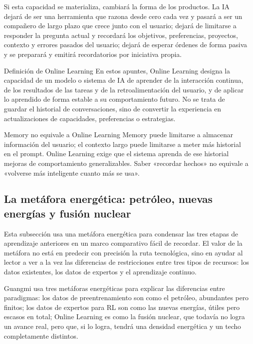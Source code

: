 \documentclass[a4paper]{article}
\begin{document}
Si esta capacidad se materializa, cambiará la forma de los productos. La IA dejará de ser una herramienta que razona desde cero cada vez y pasará a ser un compañero de largo plazo que crece junto con el usuario; dejará de limitarse a responder la pregunta actual y recordará los objetivos, preferencias, proyectos, contexto y errores pasados del usuario; dejará de esperar órdenes de forma pasiva y se preparará y emitirá recordatorios por iniciativa propia.

\begin{importantbox}{Definición de Online Learning}
En estos apuntes, Online Learning designa la capacidad de un modelo o sistema de IA de aprender de la interacción continua, de los resultados de las tareas y de la retroalimentación del usuario, y de aplicar lo aprendido de forma estable a su comportamiento futuro. No se trata de guardar el historial de conversaciones, sino de convertir la experiencia en actualizaciones de capacidades, preferencias o estrategias.
\end{importantbox}

\begin{warningbox}{Memory no equivale a Online Learning}
Memory puede limitarse a almacenar información del usuario; el contexto largo puede limitarse a meter más historial en el prompt. Online Learning exige que el sistema aprenda de ese historial mejoras de comportamiento generalizables. Saber «recordar hechos» no equivale a «volverse más inteligente cuanto más se usa».
\end{warningbox}

\subsection{La metáfora energética: petróleo, nuevas energías y fusión nuclear}

Esta subsección usa una metáfora energética para condensar las tres etapas de aprendizaje anteriores en un marco comparativo fácil de recordar. El valor de la metáfora no está en predecir con precisión la ruta tecnológica, sino en ayudar al lector a ver a la vez las diferencias de restricciones entre tres tipos de recursos: los datos existentes, los datos de expertos y el aprendizaje continuo.

Guangmi usa tres metáforas energéticas para explicar las diferencias entre paradigmas: los datos de preentrenamiento son como el petróleo, abundantes pero finitos; los datos de expertos para RL son como las nuevas energías, útiles pero escasos en total; Online Learning es como la fusión nuclear, que todavía no logra un avance real, pero que, si lo logra, tendrá una densidad energética y un techo completamente distintos.
\end{document}
